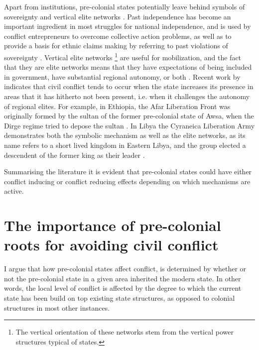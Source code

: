 \documentclass[12pt]{article}
\begin{document}
Apart from institutions, pre-colonial states potentially leave behind symbols of
sovereignty and vertical elite networks \citep{Wishman}. Past independence has
become an important ingredient in most struggles for national independence, and
is used by conflict entrepreneurs to overcome collective action problems, as
well as to provide a basis for ethnic claims making by referring to past
violations of sovereignty \citep{Ahram2019, Shelef2016}. Vertical elite networks
\footnote{The vertical orientation of these networks stem from the vertical
power structures typical of states.} are useful for mobilization, and the fact
that they are elite networks means that they have expectations of being included
in government, have substantial regional autonomy, or both \citep{Wishman}.
Recent work by \citet{Ying_2020} indicates that civil conflict tends to occur
when the state increases its presence in areas that it has hitherto not been
present, i.e. when it challenges the autonomy of regional elites. For example,
in Ethiopia, the Afar Liberation Front was originally formed by the sultan of
the former pre-colonial state of Awsa, when the Dirge regime tried to depose the
sultan \citep{Shehim1985, Hanfare2011}.  In Libya the Cyraneica Liberation Army
demonstrates both the symbolic mechanism as well as the elite networks, as its
name refers to a short lived kingdom in Eastern Libya, and the group elected a
descendent of the former king as their leader \citep{Ahram2019}.


Summarising the literature it is evident that pre-colonial states could have
either conflict inducing or conflict reducing effects depending on which
mechanisms are active.

\section{The importance of pre-colonial roots for avoiding civil conflict} \label{The importance of pre-colonial roots for avoiding civil conflict}

I argue that how pre-colonial states affect conflict, is determined by whether
or not the pre-colonial state in a given area inherited the modern state. In
other words, the local level of conflict is affected by the degree to which the
current state has been build on top existing state structures, as opposed to
colonial structures in most other instances. 
\end{document}
